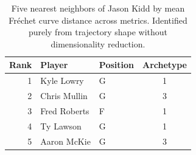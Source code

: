 \begin{table}[htbp]
  \centering\small
  \begin{tabular}{rllc}
    \toprule
    Rank & Player & Position & Archetype \\
    \midrule
    1 & Kyle Lowry & G & 1 \\
    2 & Chris Mullin & G & 3 \\
    3 & Fred Roberts & F & 1 \\
    4 & Ty Lawson & G & 1 \\
    5 & Aaron McKie & G & 3 \\
    \bottomrule
  \end{tabular}
  \caption{Five nearest neighbors of Jason Kidd by mean Fr\'{e}chet curve distance across metrics. Identified purely from trajectory shape without dimensionality reduction.}
  \label{tab:Jason_Kidd_frechet_curve_neighbors}
\end{table}


